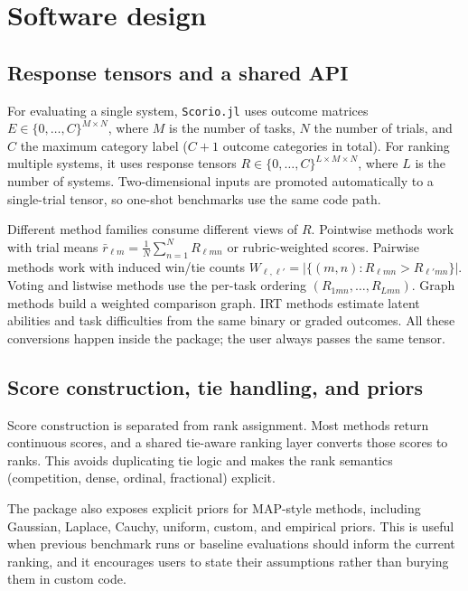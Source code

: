 \documentclass{juliacon}
\newcommand{\scorio}{\texttt{Scorio.jl}}
\begin{document}
\section{Software design}

\subsection{Response tensors and a shared API}

For evaluating a single system, \scorio{} uses outcome matrices \(E \in \{0,\ldots,C\}^{M\times N}\), where \(M\) is the number of tasks, \(N\) the number of trials, and \(C\) the maximum category label (\(C+1\) outcome categories in total). For ranking multiple systems, it uses response tensors \(R \in \{0,\ldots,C\}^{L\times M\times N}\), where \(L\) is the number of systems. Two-dimensional inputs are promoted automatically to a single-trial tensor, so one-shot benchmarks use the same code path.

Different method families consume different views of \(R\). Pointwise methods work with trial means \(\bar r_{\ell m} = \frac{1}{N}\sum_{n=1}^{N} R_{\ell mn}\) or rubric-weighted scores. Pairwise methods work with induced win/tie counts \(W_{\ell,\ell'} = \lvert\{(m,n) : R_{\ell mn} > R_{\ell' mn}\}\rvert\). Voting and listwise methods use the per-task ordering \((R_{1mn},\ldots,R_{Lmn})\). Graph methods build a weighted comparison graph. IRT methods estimate latent abilities and task difficulties from the same binary or graded outcomes. All these conversions happen inside the package; the user always passes the same tensor.

\subsection{Score construction, tie handling, and priors}

Score construction is separated from rank assignment. Most methods return continuous scores, and a shared tie-aware ranking layer converts those scores to ranks. This avoids duplicating tie logic and makes the rank semantics (competition, dense, ordinal, fractional) explicit.

The package also exposes explicit priors for MAP-style methods,
including Gaussian, Laplace, Cauchy, uniform, custom, and empirical priors. This is useful when previous benchmark runs or baseline
evaluations should inform the current ranking, and it encourages
users to state their assumptions rather than burying them in custom
code.
\end{document}
